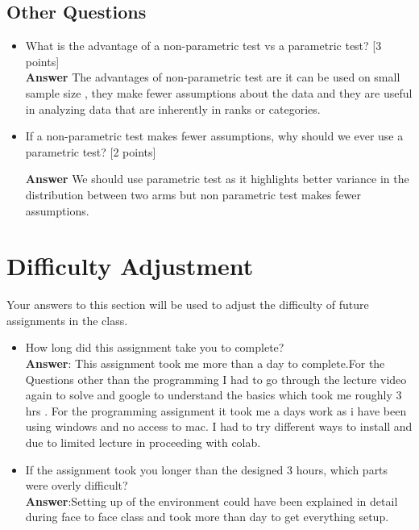 \documentclass{article}
\begin{document}
\subsection{Other Questions}
\begin{itemize}
    \item What is the advantage of a non-parametric test vs a parametric test? [3 points] \\
	\textbf{Answer} The advantages of non-parametric test are it can be used on small sample size , they make fewer assumptions about the data and they are useful in analyzing data that are inherently in ranks or categories.\\
	
	\item If a non-parametric test makes fewer assumptions, why should we ever use a parametric test? [2 points] 
	
	\textbf{Answer} We should use parametric test as it highlights better variance in the distribution between two arms but non parametric test makes fewer assumptions.
\end{itemize}

\section{Difficulty Adjustment}
Your answers to this section will be used to adjust the difficulty of future assignments in the class. 
\begin{itemize}
    \item How long did this assignment take you to complete?\\
	\textbf{Answer}: This assignment took me more than a day to complete.For the Questions other than the programming I had to go through the lecture video again to solve
and google to understand the basics which took me roughly 3 hrs . For the programming assignment it took me a days work as i have been using windows and no access to mac. I had to try different ways to install and due to limited lecture in proceeding with colab.
    \item If the assignment took you longer than the designed 3 hours, which parts were overly difficult?\\
    \textbf{Answer}:Setting up of the environment could have been explained in detail during face to face class and took more than day to get everything setup.
\end{itemize}
\end{document}
